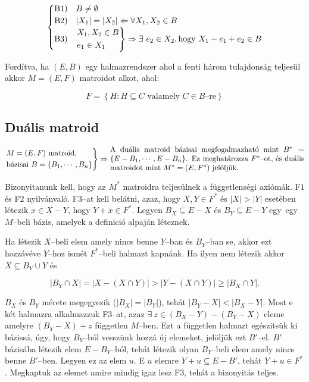 \[
\begin{cases}
\mbox{B1)} & B \neq \emptyset \\
\mbox{B2)} & |X_1|=|X_2| \Leftarrow \forall X_1,X_2 \in B\\
\mbox{B3)} & \begin{rcases}
X_1, X_2 \in B \\
e_1 \in X_1
\end{rcases}\Rightarrow \exists~e_2 \in X_2, \mbox{hogy } X_1-e_1+e_2 \in B \\
\end{cases}
\]

Fordítva, ha $(E,B)$ egy halmazrendszer ahol a fenti három tulajdonság teljesül akkor $M=(E,F)$
matroidot alkot, ahol:

\[
F = \left\{H: H \subseteq C \mbox{ valamely } C \in B\mbox{--re}\right\}
\]

\subsection{Duális matroid}

\[
\begin{rcases}
M=(E,F) \mbox{ matroid}, \\
\mbox{bázisai } B=\{B_1, \cdots, B_n\}
\end{rcases} \Rightarrow
\parbox[L]{9cm} {
A duális matroid bázisai megfogalmazható mint $B^*=\{E-B_1, \cdots, E-B_n\}$.
Ez meghatározza $F^*$--ot, és duális matroidot mint $M^*=(E,F^*)$ jelöljük.}
\]

Bizonyitanunk kell, hogy az $M^*$ matroidra teljesülnek a függetlenségi axiómák.
F$1$ és F$2$ nyilvánvaló. F$3$--at kell belátni, azaz, hogy $X,Y \in F^*$ és
$|X|>|Y|$ esetében létezik $x \in X-Y$, hogy $Y+x \in F^*$. Legyen $B_X
\subseteq E-X$ és $B_Y\subseteq E-Y$ egy--egy $M$--beli bázis, amelyek a
definició alpaján léteznek.

Ha létezik $X$--beli elem amely nincs benne $Y$--ban és $B_Y$--ban se, akkor
ezt hozzávéve $Y$--hoz ismét $F^*$--beli halmazt kapnánk. Ha ilyen nem létezik akkor 
$X \subseteq B_Y \cup Y$ és

\[
|B_Y \cap X | = |X-(X \cap Y)| > |Y - (X \cap Y)| \geq |B_X \cap Y|.
\]

$B_X$ és $B_Y$ mérete megegyezik ($|B_X|=|B_Y|$), tehát $|B_Y-X| < |B_X-Y|$.
Most e két halmazra alkalmazzuk F$3$--at, azaz $\exists~z \in (B_X-Y)-(B_Y-X)$
eleme amelyre $(B_Y-X)+z$ független $M$--ben. Ezt a független halmazt egészitsük
ki bázissá, úgy, hogy $B_Y$--ból vesszünk hozzá új elemeket, jelöljük ezt
$B'$--el. $B'$ bázisába létezik elem $E-B_Y$--ból, tehát létezik olyan $B_Y$--beli elem 
amely nincs benne $B'$--ben. Legyen ez az elem $u$. E $u$ elemre $Y+u \subseteq E - B'$,
tehát $Y+u \in F^*$. Megkaptuk az elemet amire mindig igaz lesz F$3$, tehát a bizonyitás
teljes. 

